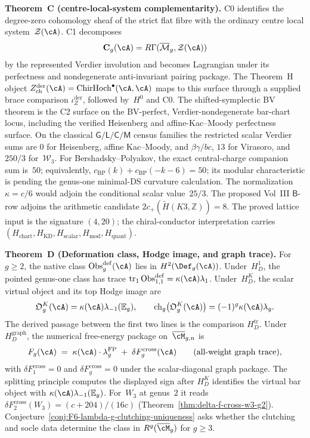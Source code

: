 \medskip

\noindent\textbf{Theorem~C (centre-local-system complementarity).}\enspace
C0 identifies the degree-zero cohomology sheaf of the strict flat fibre
with the ordinary centre local system~$\mathcal Z(\cA)$.  C1 decomposes
\[
 \mathbf C_g(\cA)
 =R\Gamma(\overline{\mathcal M}_g,\mathcal Z(\cA))
\]
by the represented Verdier involution and becomes Lagrangian under its
perfectness and nondegenerate anti-invariant pairing package.  The
Theorem~H object
$Z^{\mathrm{der}}_{\mathrm{ch}}(\cA)=\ChirHoch^\bullet(\cA,\cA)$
maps to this surface through a supplied brace comparison
$\iota_Z^{\mathrm{der}}$, followed by~$H^0$ and C0.  The
shifted-symplectic BV theorem is the C2 surface on the BV-perfect,
Verdier-nondegenerate bar-chart locus, including the verified
Heisenberg and affine-Kac--Moody perfectness surface. On the classical
$\mathsf G/\mathsf L/\mathsf C/\mathsf M$ census families the
restricted scalar Verdier sums are
$0$ for Heisenberg, affine Kac--Moody, and $\beta\gamma/bc$,
$13$ for Virasoro, and $250/3$ for~$\mathcal{W}_3$.  For
Bershadsky--Polyakov, the exact central-charge companion sum is~$50$;
equivalently,
$c_{\mathrm{BP}}(k)+c_{\mathrm{BP}}(-k-6)=50$;
its modular characteristic is \ClaimStatusOpen{} pending the genus-one
minimal-DS curvature calculation.  The normalization $\kappa=c/6$
would adjoin the conditional scalar value~$25/3$.  The proposed
Vol~III $\mathsf B$-row adjoins the
\ClaimStatusConjectured{} arithmetic candidate
$2c_+(\widetilde H(K3,\mathbb Z))=8$.  The proved lattice input is
the signature $(4,20)$; the chiral-conductor interpretation carries
$(H_{\mathrm{chart}},H_{\mathrm{KD}},H_{\mathrm{scalar}},
H_{\mathrm{mod}},H_{\mathrm{quant}})$.

\medskip

\noindent\textbf{Theorem~D (Deformation class, Hodge image, and graph
trace).}\enspace
For $g\geq2$, the native class
$\operatorname{Obs}^{\mathrm{def}}_g(\cA)$ lies in
$H^2(\Def_g(\cA))$.  Under~$H_D^1$, the pointed genus-one class has
trace
$\operatorname{tr}_1\operatorname{Obs}^{\mathrm{def}}_{1,1}
=\kappa(\cA)\lambda_1$.  Under~$H_D^K$, the scalar virtual object and
its top Hodge image are
\[
 \mathfrak O_g^K(\cA)=\kappa(\cA)\lambda_{-1}(\mathbb E_g),
 \qquad
 \operatorname{ch}_g\!\left(\mathfrak O_g^K(\cA)\right)
 =(-1)^g\kappa(\cA)\lambda_g.
\]
The derived passage between the first two lines is the comparison
$H_D^{\mathrm{tr}}$.  Under~$H_D^{\mathrm{graph}}$, the numerical
free-energy package on~$\overline{\cM}_{g,n}$ is
\[
 F_g(\cA)
 \;=\;
 \kappa(\cA)\cdot\lambda_g^{\mathrm{FP}}
 \;+\;
 \delta F_g^{\mathrm{cross}}(\cA)
 \qquad\textup{(all-weight graph trace)},
\]
with $\delta F_1^{\mathrm{cross}}=0$ and
$\delta F_g^{\mathrm{cross}}=0$ under the scalar-diagonal graph
package.  The splitting principle computes the displayed sign after
$H_D^K$ identifies the virtual bar object with
$\kappa(\cA)\lambda_{-1}(\mathbb E_g)$.  For~$W_3$ at
genus~$2$ it reads
$\delta F_2^{\mathrm{cross}}(W_3) = (c+204)/(16c)$
(Theorem~\ref{thm:delta-f-cross-w3-g2}).
Conjecture~\ref{conj:F6-lambda-g-clutching-uniqueness} asks whether
the clutching and socle data determine the class in
$R^g(\overline{\cM}_g)$ for $g\ge3$.

